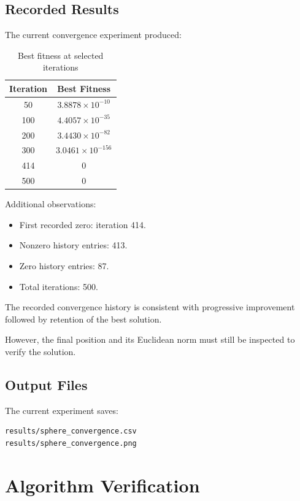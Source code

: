 \documentclass[12pt,a4paper]{report}
\begin{document}
\section{Recorded Results}

The current convergence experiment produced:

\begin{table}[H]
\centering
\caption{Best fitness at selected iterations}
\begin{tabular}{cc}
\toprule
\textbf{Iteration} & \textbf{Best Fitness}\\
\midrule
50  & $3.8878\times10^{-10}$\\
100 & $4.4057\times10^{-35}$\\
200 & $3.4430\times10^{-82}$\\
300 & $3.0461\times10^{-156}$\\
414 & 0\\
500 & 0\\
\bottomrule
\end{tabular}
\end{table}

Additional observations:

\begin{itemize}
    \item First recorded zero: iteration 414.
    \item Nonzero history entries: 413.
    \item Zero history entries: 87.
    \item Total iterations: 500.
\end{itemize}

The recorded convergence history is consistent with
progressive improvement followed by retention of the
best solution.

However, the final position and its Euclidean norm
must still be inspected to verify the solution.

\section{Output Files}

The current experiment saves:

\begin{verbatim}
results/sphere_convergence.csv
results/sphere_convergence.png
\end{verbatim}

\chapter{Algorithm Verification}
\end{document}
